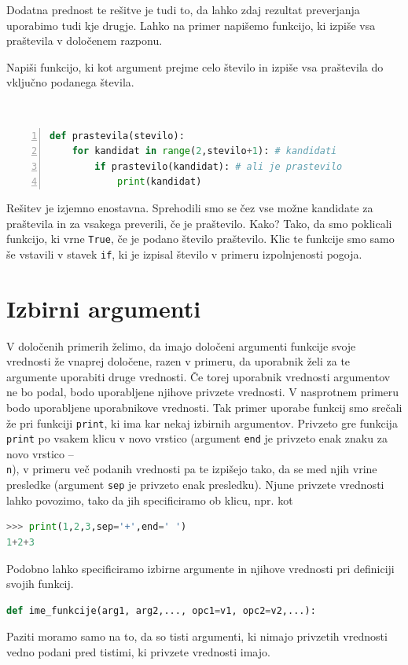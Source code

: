 Dodatna prednost te rešitve je tudi to, da lahko zdaj rezultat preverjanja uporabimo tudi kje drugje. Lahko na primer napišemo funkcijo, ki izpiše vsa praštevila v določenem razponu.
\begin{zgled}
Napiši funkcijo, ki kot argument prejme celo število in izpiše vsa praštevila do vključno podanega števila.
\end{zgled}
\begin{resitev} \  
\begin{lstlisting}[language=Python,numbers=left]
def prastevila(stevilo):
    for kandidat in range(2,stevilo+1): # kandidati
        if prastevilo(kandidat): # ali je prastevilo
            print(kandidat)
\end{lstlisting}
\end{resitev}
Rešitev je izjemno enostavna. Sprehodili smo se čez vse možne kandidate za praštevila in za vsakega preverili, če je praštevilo. Kako? Tako, da smo poklicali funkcijo, ki vrne \texttt{True}, če je podano število praštevilo. Klic te funkcije smo samo še vstavili v stavek \texttt{if}, ki je izpisal število v primeru izpolnjenosti pogoja.

\section{Izbirni argumenti}
V določenih primerih želimo, da imajo določeni argumenti funkcije svoje vrednosti že vnaprej določene, razen v primeru, da uporabnik želi za te argumente uporabiti druge vrednosti. Če torej uporabnik vrednosti argumentov ne bo podal, bodo uporabljene njihove privzete vrednosti. V nasprotnem primeru bodo uporabljene uporabnikove vrednosti. Tak primer uporabe funkcij smo srečali že pri funkciji \texttt{print}, ki ima kar nekaj izbirnih argumentov. Privzeto gre funkcija \texttt{print} po vsakem klicu v novo vrstico (argument \texttt{end} je privzeto enak znaku za novo vrstico -- \texttt{\\n}), v primeru več podanih vrednosti pa te izpišejo tako, da se med njih vrine presledke (argument \texttt{sep} je privzeto enak presledku). Njune privzete vrednosti lahko povozimo, tako da jih specificiramo ob klicu, npr. kot
\begin{lstlisting}[language=Python]
>>> print(1,2,3,sep='+',end=' ')
1+2+3
\end{lstlisting}
Podobno lahko specificiramo izbirne argumente in njihove vrednosti pri definiciji svojih funkcij. 
\begin{lstlisting}[language=Python]
def ime_funkcije(arg1, arg2,..., opc1=v1, opc2=v2,...):
\end{lstlisting}
Paziti moramo samo na to, da so tisti argumenti, ki nimajo privzetih vrednosti vedno podani pred tistimi, ki privzete vrednosti imajo.

